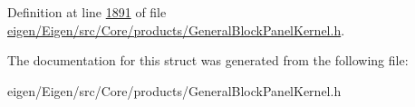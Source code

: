Definition at line \hyperlink{eigen_2_eigen_2src_2_core_2products_2_general_block_panel_kernel_8h_source_l01891}{1891} of file \hyperlink{eigen_2_eigen_2src_2_core_2products_2_general_block_panel_kernel_8h_source}{eigen/\+Eigen/src/\+Core/products/\+General\+Block\+Panel\+Kernel.\+h}.



The documentation for this struct was generated from the following file\+:\begin{DoxyCompactItemize}
\item 
eigen/\+Eigen/src/\+Core/products/\+General\+Block\+Panel\+Kernel.\+h\end{DoxyCompactItemize}
